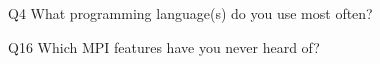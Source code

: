 \begin{description}%
\item{Q4} What programming language(s) do you use most often?%
\item{Q16} Which MPI features have you never heard of?%
\end{description}%
